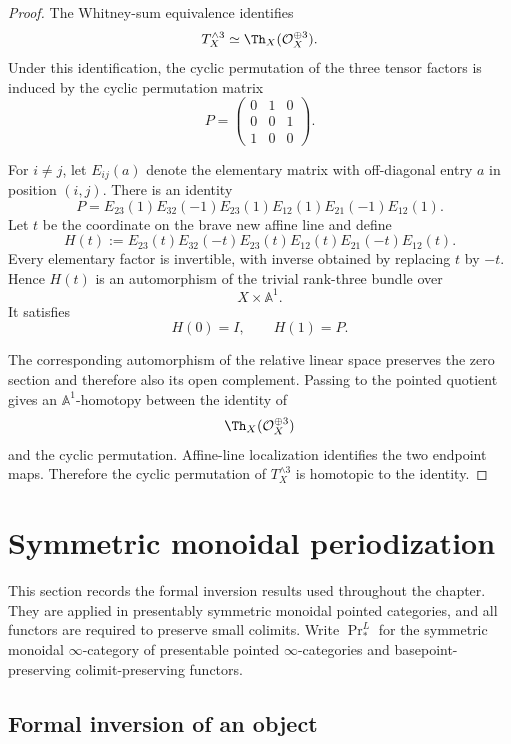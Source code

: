 \begin{proof}
The Whitney-sum equivalence identifies
\[
    T_X^{\wedge3}
    \simeq
    \Th_X(\mathcal O_X^{\oplus3}).
\]
Under this identification, the cyclic permutation of the three tensor
factors is induced by the cyclic permutation matrix
\[
    P=
    \begin{pmatrix}
        0&1&0\\
        0&0&1\\
        1&0&0
    \end{pmatrix}.
\]

For \(i\neq j\), let \(E_{ij}(a)\) denote the elementary matrix with
off-diagonal entry \(a\) in position \((i,j)\).  There is an identity
\[
    P
    =
    E_{23}(1)E_{32}(-1)E_{23}(1)
    E_{12}(1)E_{21}(-1)E_{12}(1).
\]
Let \(t\) be the coordinate on the brave new affine line and define
\[
    H(t)
    :=
    E_{23}(t)E_{32}(-t)E_{23}(t)
    E_{12}(t)E_{21}(-t)E_{12}(t).
\]
Every elementary factor is invertible, with inverse obtained by replacing
\(t\) by \(-t\).  Hence \(H(t)\) is an automorphism of the trivial
rank-three bundle over
\[
    X\times\mathbb A^1.
\]
It satisfies
\[
    H(0)=I,
    \qquad
    H(1)=P.
\]

The corresponding automorphism of the relative linear space preserves the
zero section and therefore also its open complement.  Passing to the pointed
quotient gives an \(\mathbb A^1\)-homotopy between the identity of
\[
    \Th_X(\mathcal O_X^{\oplus3})
\]
and the cyclic permutation.  Affine-line localization identifies the two
endpoint maps.  Therefore the cyclic permutation of \(T_X^{\wedge3}\) is
homotopic to the identity.
\end{proof}

\section{Symmetric monoidal periodization}
\label{sec:abstract-periodization}

This section records the formal inversion results used throughout the chapter.  They are applied in
presentably symmetric monoidal pointed categories, and all functors are required to preserve small
colimits.  Write $\Pr^L_*$ for the symmetric monoidal $\infty$-category of presentable pointed
$\infty$-categories and basepoint-preserving colimit-preserving functors.

\subsection{Formal inversion of an object}

